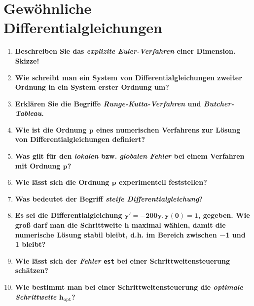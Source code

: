 \section{Gewöhnliche Differentialgleichungen}
	\begin{enumerate}
		\item \textbf{Beschreiben Sie das \textit{explizite Euler-Verfahren} einer Dimension. Skizze!}
		\item \textbf{Wie schreibt man ein System von Differentialgleichungen zweiter Ordnung in ein System erster Ordnung um?}
		\item \textbf{Erklären Sie die Begriffe \textit{Runge-Kutta-Verfahren} und \textit{Butcher-Tableau}.}
		\item \textbf{Wie ist die Ordnung \(\mathbf{p}\) eines numerischen Verfahrens zur Lösung von Differentialgleichungen definiert?}
		\item \textbf{Was gilt für den \textit{lokalen} bzw. \textit{globalen Fehler} bei einem Verfahren mit Ordnung \(\mathbf{p}\)?}
		\item \textbf{Wie lässt sich die Ordnung \(\mathbf{p}\) experimentell feststellen?}
		\item \textbf{Was bedeutet der Begriff \textit{steife Differentialgleichung}?}
		\item \textbf{Es sei die Differentialgleichung \(\mathbf{y′=−200y, y(0)=1}\), gegeben. Wie groß darf man die Schrittweite \(\mathbf{h}\) maximal wählen, damit die numerische Lösung stabil bleibt, d.h. im Bereich zwischen −1 und 1 bleibt?}
		\item \textbf{Wie lässt sich der \textit{Fehler} \texttt{est} bei einer Schrittweitensteuerung schätzen?}
		\item \textbf{Wie bestimmt man bei einer Schrittweitensteuerung die \textit{optimale Schrittweite} \(\mathbf{h}_\texttt{opt}\)?}
	\end{enumerate}